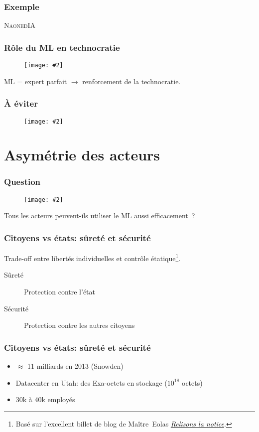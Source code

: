 \documentclass[10pt]{beamer}
\newcommand{\imgtw}[2][1]{%
  \begin{figure}%
    \centering%
    \texttt{[image: \#2]}%
  \end{figure}%
}
\newcommand{\imgth}[2][1]{%
  \begin{figure}%
    \centering%
    \texttt{[image: \#2]}%
  \end{figure}%
}
\begin{document}
\begin{frame}
  \frametitle{Exemple}
  \textsc{NaonedIA}
\end{frame}

\begin{frame}
  \frametitle{Rôle du ML en technocratie}

  \imgtw[.7]{sky}

  ML = expert parfait $\rightarrow$ renforcement de la technocratie.
\end{frame}

\begin{frame}
  \frametitle{À éviter}
  \imgtw[.9]{simpson}
\end{frame}

\section{Asymétrie des acteurs}
\label{sec:asymetrie-des-acteurs}

\begin{frame}
  \frametitle{Question}
  \imgth[.7]{david-goliath}
  Tous les acteurs peuvent-ils utiliser le ML aussi efficacement ?
\end{frame}

\begin{frame}
  \frametitle{Citoyens vs états: sûreté et sécurité}

  Trade-off entre libertés individuelles et contrôle
  étatique\footnote{Basé sur l'excellent billet de blog de
    Maître~Eolas
    \href{http://www.maitre-eolas.fr/post/2015/04/06/Relisons-la-notice}{\emph{Relisons
        la notice}}.}.

  \begin{description}
  \item[Sûreté] Protection contre l'état
  \item[Sécurité] Protection contre les autres citoyens
  \end{description}

\end{frame}

\begin{frame}
  \frametitle{Citoyens vs états: sûreté et sécurité}


  \begin{itemize}[<+->]
  \item $\approx$ 11 milliards en 2013 (Snowden)
  \item Datacenter en Utah: des Exa-octets en stockage ($10^{18}$
    octets)
  \item 30k à 40k employés
  \end{itemize}

\end{frame}
\end{document}
